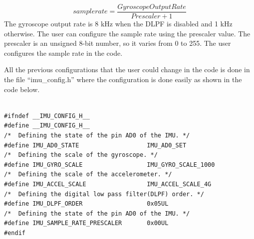 \[sample \! rate = \frac{Gyroscope Output Rate}{Prescaler + 1} \]
The gyroscope output rate is 8 kHz when the DLPF is disabled and 1 kHz otherwise.
The user can configure the sample rate using the prescaler value. The prescaler is an unsigned 8-bit number, so it varies from 0 to 255.
The user configures the sample rate in the code.

All the previous configurations that the user could change in the code is done in the file “imu\_config.h” where the configuration is done easily as shown in the code below.

\begin{lstlisting}

#ifndef	__IMU_CONFIG_H__
#define	__IMU_CONFIG_H__
/*	Defining the state of the pin AD0 of the IMU. */
#define	IMU_AD0_STATE					IMU_AD0_SET
/*	Defining the scale of the gyroscope. */
#define IMU_GYRO_SCALE					IMU_GYRO_SCALE_1000
/*	Defining the scale of the accelerometer. */
#define IMU_ACCEL_SCALE					IMU_ACCEL_SCALE_4G
/*	Defining the digital low pass filter(DLPF) order. */
#define	IMU_DLPF_ORDER					0x05UL
/*	Defining the state of the pin AD0 of the IMU. */
#define	IMU_SAMPLE_RATE_PRESCALER		0x00UL
#endif

\end{lstlisting}

